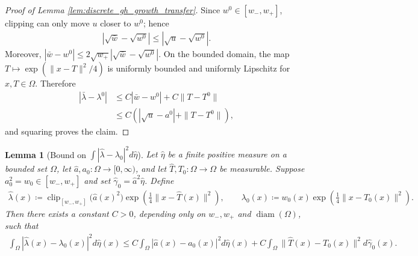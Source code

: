 \documentclass[11pt,reqno]{amsart}
\newtheorem{lemma}[theorem]{Lemma}
\theoremstyle{definition}
\renewcommand{\hat}{\widehat}
\DeclareMathOperator{\clip}{clip}
\begin{document}
\begin{proof}[Proof of Lemma \ref{lem:discrete_gh_growth_transfer}]
Since $w^0\in[w_-,w_+]$, clipping can only move $u$ closer to $w^0$; hence
\begin{align*}
    |\sqrt{\bar w}-\sqrt{w^0}|
    \le
    |\sqrt{u}-\sqrt{w^0}|.
\end{align*}
Moreover, $|\bar w-w^0|\le 2\sqrt{w_+}|\sqrt{\bar w}-\sqrt{w^0}|$. On the bounded domain, the map $T\mapsto\exp(\|x-T\|^2/4)$ is uniformly bounded and uniformly Lipschitz for $x,T\in\Omega$. Therefore
\begin{align*}
    |\bar\lambda-\lambda^0|
    &\le
    C|\bar w-w^0|+C\|T-T^0\| \\
    &\le
    C\left(|\sqrt{u}-a^0|+\|T-T^0\|\right),
\end{align*}
and squaring proves the claim.
\end{proof}

\begin{lemma}[Bound on $\int|\hat\lambda-\lambda_0|^2 d\hat\eta$]
\label{lem:continuous_gh_growth_transfer}
Let $\hat\eta$ be a finite positive measure on a bounded set $\Omega$, let $\hat a,a_0:\Omega\to[0,\infty)$, and let $\hat T,T_0:\Omega\to\Omega$ be measurable. Suppose $a_0^2=w_0\in[w_-,w_+]$ and set $\hat\gamma_0=\hat a^2\hat\eta$. Define
\begin{align*}
    \hat\lambda(x)
    \coloneqq
    \clip_{[w_-,w_+]}\bigl(\hat a(x)^2\bigr)
    \exp\left(\frac14\|x-\hat T(x)\|^2\right),
    \qquad
    \lambda_0(x)
    \coloneqq
    w_0(x)\exp\left(\frac14\|x-T_0(x)\|^2\right).
\end{align*}
Then there exists a constant $C>0$, depending only on $w_-,w_+$ and $\operatorname{diam}(\Omega)$, such that
\begin{align}
\label{eq:continuous_gh_growth_transfer}
    \int_\Omega |\hat\lambda(x)-\lambda_0(x)|^2 d\hat\eta(x)
    \le
    C\int_\Omega |\hat a(x)-a_0(x)|^2 d\hat\eta(x)
    + C\int_\Omega \|\hat T(x)-T_0(x)\|^2 d\hat\gamma_0(x).
\end{align}
\end{lemma}
\end{document}
